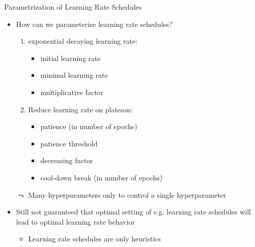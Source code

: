 \begin{frame}[c]{Parametrization of Learning Rate Schedules}
	
	\begin{itemize}
		\item How can we parameterize learning rate schedules?
		\begin{enumerate}
			\item exponential decaying learning rate:
			\begin{itemize}
				\item initial learning rate
				\item minimal learning rate
				\item multiplicative factor
			\end{itemize}
			\pause
			\item Reduce learning rate on plateaus:
			\begin{itemize}
				\item patience (in number of epochs)
				\item patience threshold
				\item decreasing factor
				\item cool-down break (in number of epochs)
			\end{itemize}
		\end{enumerate}
		\pause
		\medskip
		\item[$\leadsto$] Many hyperparameters only to control a single hyperparameter
		\pause   
		\item Still not guaranteed that optimal setting of e.g. learning rate schedules will lead to optimal learning rate behavior
		\begin{itemize}
			\item Learning rate schedules are only heuristics
		\end{itemize}
	\end{itemize}
	
\end{frame}
